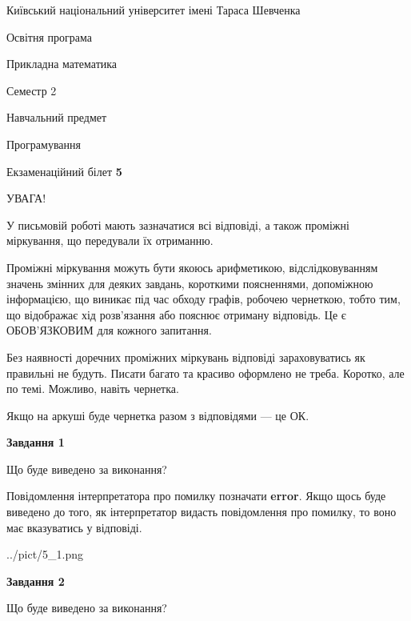 \documentclass[12pt, ukrainian]{article}
\begin{document}
{{\begin {small}\par
{ \center  Київський національний університет імені Тараса Шевченка \par}
{\parbox {5 cm}{Освітня програма \hfill}{\parbox {7 cm}{Прикладна математика \hfill}}\parbox {6 cm}{\hfill Семестр 2}}\par
{\parbox {5 cm} {Навчальний предмет \hfill}\parbox {7 cm}{Програмування \hfill}\parbox {6cm}{\hfill}\par}\vspace{-7pt} \end{small}}{\center Екзаменаційний білет \No \textbf
{ 5 }\par}}
{
\begin {large}
УВАГА!

У письмовій роботі мають зазначатися всі відповіді, а також проміжні міркування, що передували їх отриманню.

Проміжні міркування можуть бути якоюсь арифметикою, відслідковуванням зна\-чень змінних для деяких завдань,
короткими поясненнями, допоміжною інформацією, що виникає під час обходу графів, робочею чернеткою,
тобто тим, що відображає хід розв’язання або пояснює отриману відповідь.
Це є ОБОВ’ЯЗКОВИМ для кожного запитання.

Без наявності доречних проміжних міркувань відповіді зараховуватись як правиль\-ні не будуть.
Писати багато та красиво оформлено не треба. Коротко, але по темі. Можли\-во, навіть чернетка.

Якщо на аркуші буде чернетка разом з відповідями --- це ОК.

\newpage

{\begin {center}\textbf{Завдання 1}\end {center}}\par
Що буде виведено за виконання?

Повідомлення інтерпретатора про помилку позначати \textbf{error}.
Якщо щось буде виведено до того, як інтерпретатор видасть повідомлення про помилку, 
то воно має вказуватись у відповіді. \par


\begin{center}
	{../pict/5_1.png}
\end{center}
\newpage

{\begin {center}\textbf{Завдання 2}\end {center}}\par
Що буде виведено за виконання?


\end{large}}
\end{document}
